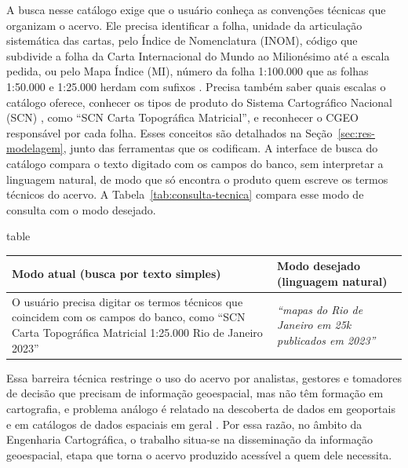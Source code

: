 A busca nesse catálogo exige que o usuário conheça as convenções técnicas que organizam o acervo. Ele precisa identificar a folha, unidade da articulação sistemática das cartas, pelo Índice de Nomenclatura (INOM), código que subdivide a folha da Carta Internacional do Mundo ao Milionésimo até a escala pedida, ou pelo Mapa Índice (MI), número da folha 1:100.000 que as folhas 1:50.000 e 1:25.000 herdam com sufixos \cite{ibge1999nocoes}. Precisa também saber quais escalas o catálogo oferece, conhecer os tipos de produto do Sistema Cartográfico Nacional (SCN) \cite{scn2016}, como ``SCN Carta Topográfica Matricial'', e reconhecer o CGEO responsável por cada folha. Esses conceitos são detalhados na Seção~\ref{sec:res-modelagem}, junto das ferramentas que os codificam. A interface de busca do catálogo compara o texto digitado com os campos do banco, sem interpretar a linguagem natural, de modo que só encontra o produto quem escreve os termos técnicos do acervo. A Tabela~\ref{tab:consulta-tecnica} compara esse modo de consulta com o modo desejado.

\begin{fixo}{table}
\centering
\caption{Consulta técnica e consulta em linguagem natural}
\label{tab:consulta-tecnica}
\begin{tabular}{|>{\raggedright\arraybackslash}p{}|>{\raggedright\arraybackslash}p{}|}
\hline
\textbf{Modo atual (busca por texto simples)} & \textbf{Modo desejado (linguagem natural)} \\
\hline
O usuário precisa digitar os termos técnicos que coincidem com os campos do banco, como ``SCN Carta Topográfica Matricial 1:25.000 Rio de Janeiro 2023'' & \textit{``mapas do Rio de Janeiro em 25k publicados em 2023''} \\
\hline
\end{tabular}
\end{fixo}

Essa barreira técnica restringe o uso do acervo por analistas, gestores e tomadores de decisão que precisam de informação geoespacial, mas não têm formação em cartografia, e problema análogo é relatado na descoberta de dados em geoportais e em catálogos de dados espaciais em geral \cite{hu2015metadata, li2025question}. Por essa razão, no âmbito da Engenharia Cartográfica, o trabalho situa-se na disseminação da informação geoespacial, etapa que torna o acervo produzido acessível a quem dele necessita.

